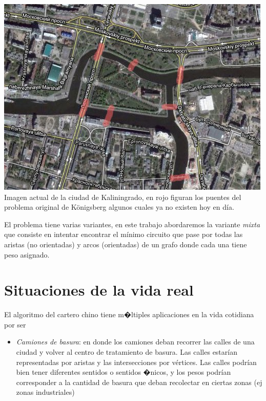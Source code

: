\documentclass[11pt, a4paper, spanish]{article}
\begin{document}
\begin{center}
\centering \includegraphics[scale=0.70]{img/KaliningradoBridges.jpg}\\
\small{Imagen actual de la ciudad de Kaliningrado, en rojo figuran los puentes del problema original de K\"{o}nigsberg algunos cuales ya no existen hoy en d\'ia.}
\end{center}	

El problema tiene varias variantes, en este trabajo abordaremos la variante \emph{mixta} que consiste en intentar encontrar el m\'inimo circuito que pase por todas las aristas (no orientadas) y arcos (orientadas) de un grafo donde cada una tiene peso asignado.

\newpage
\section{Situaciones de la vida real}

    El algoritmo del cartero chino tiene m�ltiples aplicaciones en la vida cotidiana por ser

	\begin{itemize}
	\item \emph{Camiones de basura}: en donde los camiones deban recorrer las calles de una ciudad y volver al centro de tratamiento de basura. Las calles estar\'ian representadas por aristas y las intersecciones por v\'ertices. Las calles podr\'ian bien tener diferentes sentidos o sentidos �nicos, y los pesos podr\'ian corresponder a la cantidad de basura que deban recolectar en ciertas zonas (ej zonas industriales)
	\end{itemize}
\end{document}
